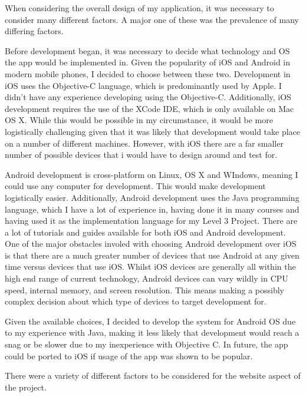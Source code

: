 \documentclass{l4proj}
\begin{document}
When considering the overall design of my application, it was necessary to consider many different factors. A major one of these was the prevalence of many differing factors.

Before development began, it was necessary to decide what technology and OS the app would be implemented in. Given the popularity of iOS and Android in modern mobile phones, I decided to choose between these two. Development in iOS uses the Objective-C language, which is predominantly used by Apple. I didn’t have any experience developing using the Objective-C. Additionally, iOS development requires the use of the XCode IDE, which is only available on Mac OS X.  While this would be possible in my circumstance, it would be more logistically challenging given that it was likely that development would take place on a number of different machines. However, with iOS there are a far smaller number of possible devices that i would have to design around and test for.

Android development is cross-platform on Linux, OS X and WIndows, meaning I could use any computer for development. This would make development logistically easier. Additionally, Android development uses the Java programming language, which I have a lot of experience in, having done it in many courses and having used it as the implementation language for my Level 3 Project. There are a lot of tutorials and guides available for both iOS and Android development. One of the major obstacles involed with choosing Android development over iOS is that there are a much greater number of devices that use Android at any given time versus devices that use iOS. Whilst iOS devices are generally all within the high end range of current technology, Android devices can vary wildly in CPU speed, internal memory, and screen resolution. This means making a possibly complex decision about which type of devices to target development for.

Given the available choices, I decided to develop the system for Android OS due to my experience with Java, making it less likely that development would reach a snag or be slower due to my inexperience with Objective C. In future, the app could be ported to iOS if usage of the app was shown to be popular.

There were a variety of different factors to be considered for the website aspect of the project.

\end{document}
